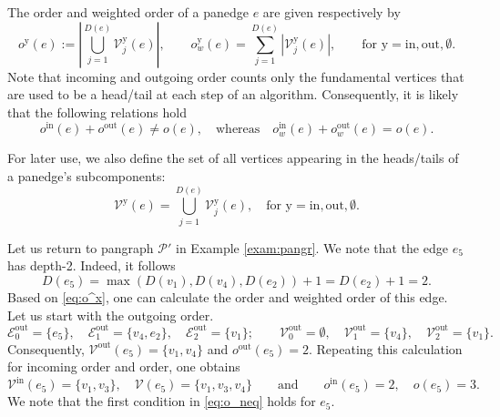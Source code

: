 \documentclass[a4paper,12pt]{article}
\theoremstyle{definition}
\theoremstyle{remark}
\newcommand{\mP}{\mathcal{P}}
\newcommand{\tin}{\mathrm{in}}
\newcommand{\out}{\mathrm{out}}
\begin{document}
The order and weighted order of a panedge $e$ are given respectively by
\begin{equation}\label{eq:o^x}
o^\textrm{y}(e):=\left|\bigcup_{j=1}^{D(e)} \mathcal{V}^\textrm{y}_j(e)\right|,\qquad o^\textrm{y}_w(e)=\sum_{j=1}^{D(e)} |\mathcal{V}_j^\textrm{y}(e)|,\qquad \text{for}\,\,\textrm{y}=\tin,\out,\emptyset.
\end{equation}
Note that incoming and outgoing order counts only the fundamental vertices that are used to be a head/tail at each step of an algorithm. Consequently, it is likely that the following relations hold
\begin{equation}\label{eq:o_neq}
o^{\tin}(e)+o^{\out}(e)\neq o(e),\quad  \textrm{whereas} \quad o_w^{\tin}(e)+o_w^{\out}(e)= o(e).
\end{equation}

For later use, we also define the set of all vertices appearing in the heads/tails of a panedge's subcomponents:
\begin{equation}\label{def:all_tails_heads}
   \mathcal{V}^{\textrm{y}}(e)=\bigcup_{j=1}^{D(e)} \mathcal{V}^\textrm{y}_j(e), \quad \textrm{for y}=\tin, \out,\emptyset.
\end{equation}

Let us return to pangraph $\mP'$ in Example \ref{exam:pangr}. We note that the edge $e_5$ has depth-2. Indeed, it follows 
 \begin{equation}
 D(e_5)=\max\left(D(v_1),D(v_4),D(e_2)\right)+1=D(e_2)+1=2.
 \end{equation}
Based on \eqref{eq:o^x}, one can calculate the order and weighted order of this edge. Let us start with the outgoing order.
\begin{equation*}
\mathcal{E}_0^{\textrm{out}}=\{e_5\},\quad \mathcal{E}_1^{\textrm{out}}=\{v_4,e_2\},\quad \mathcal{E}_2^{\textrm{out}}=\{v_1\}; \qquad \mathcal{V}_0^{\textrm{out}}=\emptyset, \quad \mathcal{V}_1^{\textrm{out}}=\{v_4\},\quad \mathcal{V}_2^{\textrm{out}}=\{v_1\}.
\end{equation*}
Consequently, $\mathcal{V}^{\textrm{out}}(e_5)=\{v_1,v_4\}$ and $o^{\textrm{out}}(e_5)=2$. Repeating this calculation for incoming order and order, one obtains
\begin{equation*}
\mathcal{V}^{\textrm{in}}(e_5)=\{v_1, v_3 \},\quad  \mathcal{V}(e_5)=\{v_1,v_3, v_4\}\qquad \textrm{and}\qquad o^{\textrm{in}}(e_5)=2,\quad o(e_5)=3. 
\end{equation*}
We note that the first condition in \eqref{eq:o_neq} holds for $e_5$. 
\end{document}
